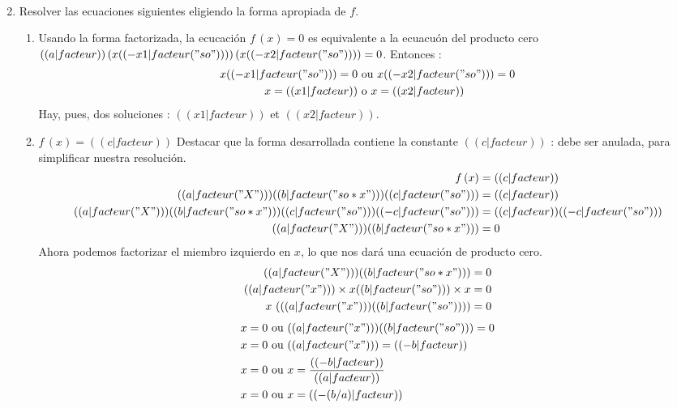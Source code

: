 \begin{enumerate}
\begin{enumerate}
\begin{align*}
        \end{align*}
\end{enumerate}
\item Resolver las ecuaciones siguientes eligiendo la forma apropiada de $f$.
\begin{enumerate}
\item Usando la forma factorizada, la ecucación $f\,(x)=0$ es equivalente a la ecuacuón del producto cero $(( a|facteur ))\,(x (( -x1|facteur("so") )) )\,(x (( -x2|facteur("so") )) ) = 0$. Entonces :
\begin{align*}
x (( -x1|facteur("so") ))=0 &\text{ ou } x (( -x2|facteur("so") ))=0 \\
x=(( x1|facteur )) &\text{ o } x=(( x2|facteur ))
\end{align*}
Hay, pues, dos soluciones : $(( x1|facteur ))$ et $(( x2|facteur ))$.
\item $f\,(x)=(( c|facteur ))$ Destacar que la forma desarrollada contiene la constante $(( c|facteur ))$ : debe ser anulada, para simplificar nuestra resolución.
\begin{align*}
f\,(x) &= (( c|facteur )) \\
(( a|facteur("X") )) (( b|facteur("so*x") )) (( c|facteur("so") )) &= (( c|facteur )) \\
(( a|facteur("X") )) (( b|facteur("so*x") )) (( c|facteur("so") )) (( -c|facteur("so") )) &= (( c|facteur )) (( -c|facteur("so") )) \\
(( a|facteur("X") )) (( b|facteur("so*x") )) &= 0 \\
\end{align*}
Ahora podemos factorizar el miembro izquierdo en $x$, lo que nos dará una ecuación de producto cero.
\begin{align*}
(( a|facteur("X") )) (( b|facteur("so*x") )) &= 0 \\
(( a|facteur("x") ))\times{} x (( b|facteur("so") ))\times{} x &= 0 \\
x\,\left( (( a|facteur("x") )) (( b|facteur("so") )) \right) &= 0 \\
\end{align*}
\begin{align*}
x =0 &\text{ ou } (( a|facteur("x") )) (( b|facteur("so") ))=0 \\
x =0 &\text{ ou } (( a|facteur("x") )) =(( -b|facteur )) \\
x =0 &\text{ ou } x = \frac{(( -b|facteur ))}{(( a|facteur ))} \\
x =0 &\text{ ou } x = (( -(b/a)|facteur )) \\

\end{align*}
\end{enumerate}
\end{enumerate}
